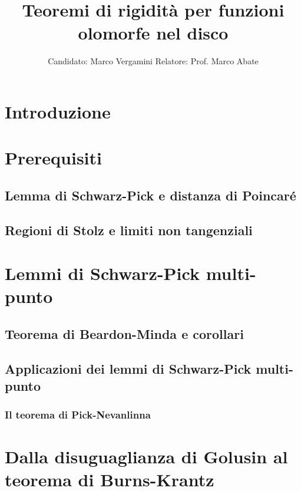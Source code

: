 \documentclass{article}
\title{Teoremi di rigidità per funzioni olomorfe nel disco}
\date{}
\author{Candidato: Marco Vergamini \qquad Relatore: Prof. Marco Abate}
\begin{document}
\maketitle
\newpage
\tableofcontents
\newpage


\section*{Introduzione}


\newpage

\section{Prerequisiti}

\subsection{Lemma di Schwarz-Pick e distanza di Poincaré}


\subsection{Regioni di Stolz e limiti non tangenziali}


\newpage

\section{Lemmi di Schwarz-Pick multi-punto}

\subsection{Teorema di Beardon-Minda e corollari}


\subsection{Applicazioni dei lemmi di Schwarz-Pick multi-punto}


\subsubsection{Il teorema di Pick-Nevanlinna}


\newpage

\section{Dalla disuguaglianza di Golusin al teorema di Burns-Krantz}
\end{document}
